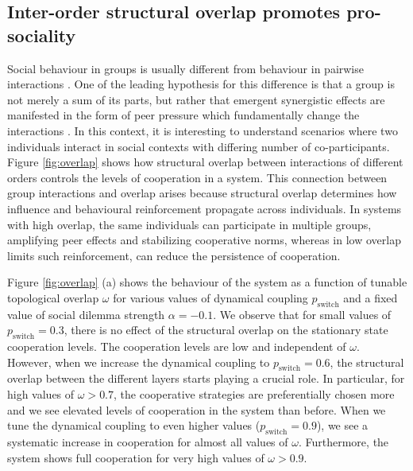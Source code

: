 \documentclass[a4paper,pre,reqno,superscriptaddress,twocolumn, floatfix]{revtex4}
\begin{document}
\subsection{Inter-order structural overlap promotes pro-sociality}


Social behaviour in groups is usually different from behaviour in pairwise interactions \cite{krause_social_2007, capraro_group_2015, pereda_group_2019}. One of the leading hypothesis for this difference is that a group is not merely a sum of its parts, but rather that emergent synergistic effects are manifested in the form of peer pressure which fundamentally change the interactions \cite{christakis_spread_2007, fowler_dynamic_2008}. In this context, it is interesting to understand scenarios where two individuals interact in social contexts with differing number of co-participants. Figure \eqref{fig:overlap} shows how structural overlap between interactions of different orders controls the levels of cooperation in a system. This connection between group interactions and overlap arises because structural overlap determines how influence and behavioural reinforcement propagate across individuals. In systems with high overlap, the same individuals can participate in multiple groups, amplifying peer effects and stabilizing cooperative norms, whereas in low overlap limits such reinforcement, can reduce the persistence of cooperation.



Figure \eqref{fig:overlap} (a) shows the behaviour of the system as a function of tunable topological overlap $\omega$ for various values of dynamical coupling $p_{\text{switch}}$ and a fixed value of social dilemma strength $\alpha=-0.1$. We observe that for small values of $p_{\text{switch}} = 0.3$, there is no effect of the structural overlap on the stationary state cooperation levels. The cooperation levels are low and independent of $\omega$. However, when we increase the dynamical coupling to $p_{\text{switch}}=0.6$, the structural overlap between the different layers starts playing a crucial role. In particular, for high values of $\omega >0.7$, the cooperative strategies are preferentially chosen more and we see elevated levels of cooperation in the system than before. When we tune the dynamical coupling to even higher values ($p_{\text{switch}}=0.9$), we see a systematic increase in cooperation for almost all values of $\omega$. Furthermore, the system shows full cooperation for very high values of $\omega > 0.9$. 
\end{document}
